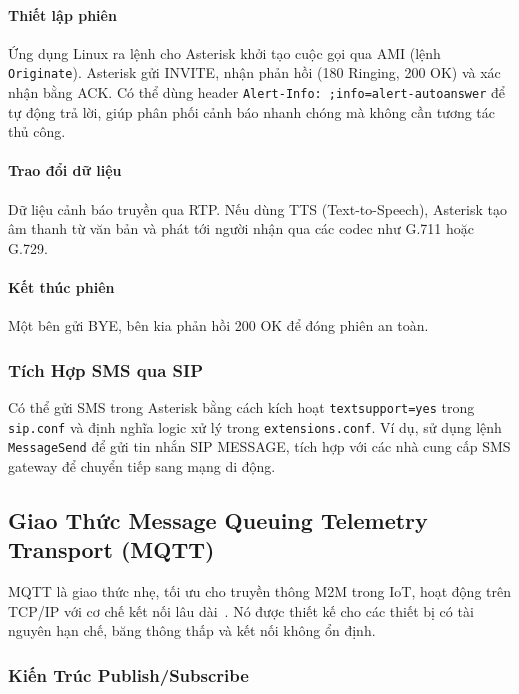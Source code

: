 \paragraph{Thiết lập phiên}
Ứng dụng Linux ra lệnh cho Asterisk khởi tạo cuộc gọi qua AMI (lệnh \texttt{Originate}). Asterisk gửi INVITE, nhận phản hồi (180 Ringing, 200 OK) và xác nhận bằng ACK. Có thể dùng header \texttt{Alert-Info: ;info=alert-autoanswer} để tự động trả lời, giúp phân phối cảnh báo nhanh chóng mà không cần tương tác thủ công.

\paragraph{Trao đổi dữ liệu}
Dữ liệu cảnh báo truyền qua RTP. Nếu dùng TTS (Text-to-Speech), Asterisk tạo âm thanh từ văn bản và phát tới người nhận qua các codec như G.711 hoặc G.729.

\paragraph{Kết thúc phiên}
Một bên gửi BYE, bên kia phản hồi 200 OK để đóng phiên an toàn.

\subsubsection{Tích Hợp SMS qua SIP}
\label{subsubsec:sip_sms}

Có thể gửi SMS trong Asterisk bằng cách kích hoạt \texttt{textsupport=yes} trong \texttt{sip.conf} và định nghĩa logic xử lý trong \texttt{extensions.conf}. Ví dụ, sử dụng lệnh \texttt{MessageSend} để gửi tin nhắn SIP MESSAGE, tích hợp với các nhà cung cấp SMS gateway để chuyển tiếp sang mạng di động.


\subsection{Giao Thức Message Queuing Telemetry Transport (MQTT)}
\label{subsec:mqtt_protocol}

MQTT là giao thức nhẹ, tối ưu cho truyền thông M2M trong IoT, hoạt động trên TCP/IP với cơ chế kết nối lâu dài~\cite{mqtt_oasis_standard}. Nó được thiết kế cho các thiết bị có tài nguyên hạn chế, băng thông thấp và kết nối không ổn định.

\subsubsection{Kiến Trúc Publish/Subscribe}
\label{subsubsec:mqtt_pubsub}

